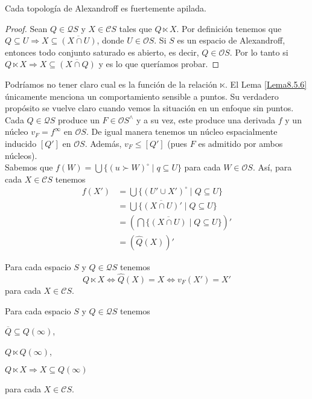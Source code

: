 \begin{lem}\label{Lema8.5.7}
    Cada topología de Alexandroff es fuertemente apilada.
\end{lem}

\begin{proof}
    Sean $Q\in \mathcal{Q}S$ y $X\in \mathcal{C}S$ tales que $Q\ltimes X$. Por definición tenemos que $Q\subseteq U\Rightarrow X\subseteq \overline{(X\cap U)}$, donde $U\in \mathcal{O}S$. Si $S$ es un espacio de Alexandroff, entonces todo conjunto saturado es abierto, es decir, $Q\in \mathcal{O}S$. Por lo tanto si $Q\ltimes X \Rightarrow X\subseteq \overline{(X\cap Q)}$ y es lo que queríamos probar.
\end{proof}

Podríamos no tener claro cual es la función de la relación $\ltimes$. El Lema \ref{Lema8.5.6} únicamente menciona un comportamiento sensible a puntos. Su verdadero propósito se vuelve claro cuando vemos la situación en un enfoque sin puntos.\\

Cada $Q\in\mathcal{Q}S$ produce un $F\in \mathcal{O}S^\wedge$ y a su vez, este produce una derivada $f$ y un núcleo $v_F=f^\infty$ en $\mathcal{O}S$. De igual manera tenemos un núcleo espacialmente inducido $[Q']$ en $\mathcal{O}S$. Además, $v_F\leq [Q']$ (pues $F$ es admitido por ambos núcleos). \\

Sabemos que $f(W)=\bigcup\{(u\succ W)^\circ\mid q\subseteq U\}$ para cada $W\in \mathcal{O}S$. Así, para cada $X\in\mathcal{C}S$ tenemos
\[
\begin{split}
f(X')&=\bigcup\{(U'\cup X')^\circ\mid Q\subseteq U\}\\
&=\bigcup\{\overline{(X\cap U)}'\mid Q\subseteq U\}\\
& =\left(\bigcap\{\overline{(X\cap U)}\mid Q\subseteq U\}\right)'\\
&=(\hat{Q}(X))'
\end{split}
\]

\begin{lem}\label{Lema8.5.8}
    Para cada espacio $S$ y $Q\in \mathcal{Q}S$ tenemos
    \[
    Q\ltimes X\Leftrightarrow \hat{Q}(X)=X\Leftrightarrow v_F(X')=X'
    \]
    para cada $X\in \mathcal{C}S$.
\end{lem}

\begin{lem}\label{Lema8.5.9}
    Para cada espacio $S$ y $Q\in \mathcal{Q}S$ tenemos
    \begin{enumerate}[a)]
    \begin{multicols}{3}
        \item $\overline{Q}\subseteq Q(\infty)$,
        \item $Q\ltimes Q(\infty)$,
        \item  $Q\ltimes X\Rightarrow X\subseteq Q(\infty)$
    \end{multicols}
    \end{enumerate}
    para cada $X\in \mathcal{C}S$.
\end{lem}

